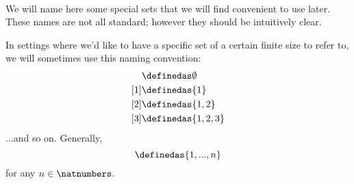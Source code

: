 {\


We will name here some special sets that we will find convenient to use later. These names are not all standard; however they should be intuitively clear.

In settings where we'd like to have a specific set of a certain finite size to refer to, we will sometimes use this naming convention:
\begin{align*}
[0]
  & \definedas \emptyset \\
  [1] & \definedas \{ 1\} \\
  [2] & \definedas \{ 1, 2\} \\
  [3] & \definedas \{ 1, 2, 3\}
\end{align*}
...and so on. Generally,
\begin{equation}
[n]
  \definedas \{ 1, ..., n\}
\end{equation}
for any $n \in \natnumbers$.}



\clearpage
